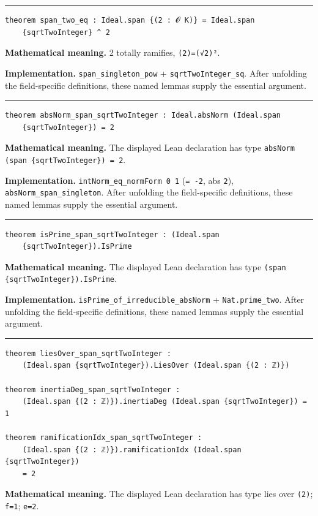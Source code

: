\documentclass[UTF8,a4paper,11pt,fontset=fandol]{ctexart}
\theoremstyle{definition}
\newcommand{\statementsep}{\par\medskip\hrule\medskip}
\begin{document}
\statementsep
\begin{verbatim}
theorem span_two_eq : Ideal.span {(2 : 𝓞 K)} = Ideal.span
    {sqrtTwoInteger} ^ 2
\end{verbatim}
\noindent\textbf{Mathematical meaning.} 2 totally ramifies, \texttt{(2)=(√2)²}.\par
\noindent\textbf{Implementation.} \texttt{span\_\allowbreak{}singleton\_\allowbreak{}pow} + \texttt{sqrtTwoInteger\_\allowbreak{}sq}. After unfolding the field-specific definitions, these named lemmas supply the essential argument.\par
\statementsep
\begin{verbatim}
theorem absNorm_span_sqrtTwoInteger : Ideal.absNorm (Ideal.span
    {sqrtTwoInteger}) = 2
\end{verbatim}
\noindent\textbf{Mathematical meaning.} The displayed Lean declaration has type \texttt{absNorm (span \{sqrtTwoInteger\}) = 2}.\par
\noindent\textbf{Implementation.} \texttt{intNorm\_\allowbreak{}eq\_\allowbreak{}normForm 0 1} (\texttt{= -2}, abs \texttt{2}), \texttt{absNorm\_\allowbreak{}span\_\allowbreak{}singleton}. After unfolding the field-specific definitions, these named lemmas supply the essential argument.\par
\statementsep
\begin{verbatim}
theorem isPrime_span_sqrtTwoInteger : (Ideal.span
    {sqrtTwoInteger}).IsPrime
\end{verbatim}
\noindent\textbf{Mathematical meaning.} The displayed Lean declaration has type \texttt{(span \{sqrtTwoInteger\}).\allowbreak{}IsPrime}.\par
\noindent\textbf{Implementation.} \texttt{isPrime\_\allowbreak{}of\_\allowbreak{}irreducible\_\allowbreak{}absNorm} + \texttt{Nat.\allowbreak{}prime\_\allowbreak{}two}. After unfolding the field-specific definitions, these named lemmas supply the essential argument.\par
\statementsep
\begin{verbatim}
theorem liesOver_span_sqrtTwoInteger :
    (Ideal.span {sqrtTwoInteger}).LiesOver (Ideal.span {(2 : ℤ)})

theorem inertiaDeg_span_sqrtTwoInteger :
    (Ideal.span {(2 : ℤ)}).inertiaDeg (Ideal.span {sqrtTwoInteger}) = 1

theorem ramificationIdx_span_sqrtTwoInteger :
    (Ideal.span {(2 : ℤ)}).ramificationIdx (Ideal.span {sqrtTwoInteger})
    = 2
\end{verbatim}
\noindent\textbf{Mathematical meaning.} The displayed Lean declaration has type lies over \texttt{(2)}; \texttt{f=1}; \texttt{e=2}.\par
\end{document}
